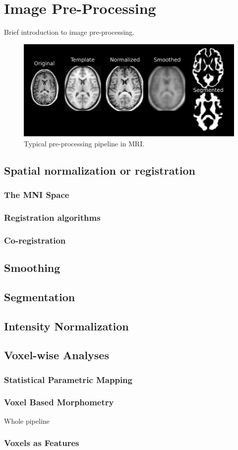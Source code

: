 \chapter{Image Pre-Processing}\label{ch:mathtest} %
Brief introduction to image pre-processing. 
\begin{figure}[bth]
	\myfloatalign
	\includegraphics[width=.75\linewidth]{gfx/ch3/preProcessPL}
	\caption[Typical pre-processing pipeline in MRI]{Typical pre-processing pipeline in \ac{MRI}.}\label{fig:example}
\end{figure}
\section{Spatial normalization or registration}
\subsection{The MNI Space}
\subsection{Registration algorithms}
\subsection{Co-registration}

\section{Smoothing}
\section{Segmentation}
\section{Intensity Normalization}
\section{Voxel-wise Analyses}
\subsection{Statistical Parametric Mapping}
\subsection{Voxel Based Morphometry}
Whole pipeline
\subsection{Voxels as Features}